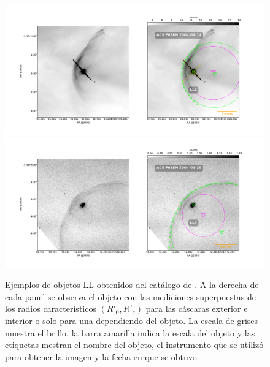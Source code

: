 \begin{figure}
  \centering
    \includegraphics[width=\linewidth]{./Figures/LL1-Bally_01-images}\\  \includegraphics[width=\linewidth]{./Figures/LL4-Bally_24-images}\\ %
  \caption{Ejemplos de objetos LL obtenidos del catálogo de \citet{Gutierrez-Soto:2015a}. A la derecha de cada panel se observa el objeto con las mediciones superpuestas de los radios característicos $(R'_0, R'_c)$ para las cáscaras exterior e interior o solo para una dependiendo del objeto. La escala de grises muestra el brillo, la barra amarilla indica la escala del objeto y las etiquetas mestran el nombre del objeto, el instrumento que se utilizó para obtener la imagen y la fecha en que se obtuvo.}
  \label{fig:Luis-mosaic-1}
\end{figure}

